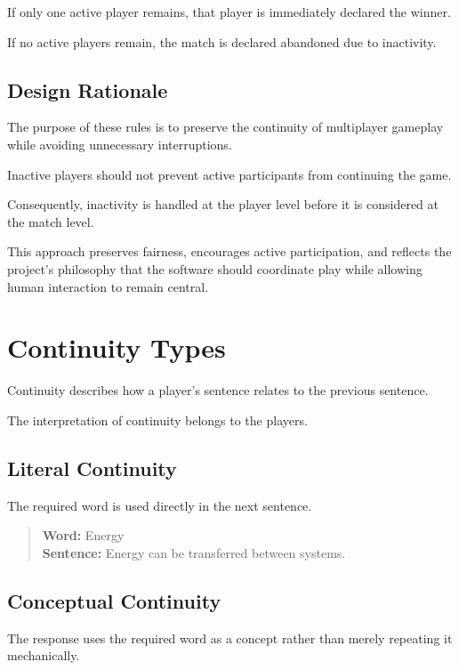 \documentclass[11pt,a4paper]{article}
\begin{document}
If only one active player remains, that player is immediately declared the winner.

If no active players remain, the match is declared abandoned due to inactivity.


\subsection{Design Rationale}

The purpose of these rules is to preserve the continuity of multiplayer gameplay while avoiding unnecessary interruptions.

Inactive players should not prevent active participants from continuing the game.

Consequently, inactivity is handled at the player level before it is considered at the match level.

This approach preserves fairness, encourages active participation, and reflects the project's philosophy that the software should coordinate play while allowing human interaction to remain central.

\section{Continuity Types}

Continuity describes how a player's sentence relates to the previous sentence.

The interpretation of continuity belongs to the players.

\subsection{Literal Continuity}

The required word is used directly in the next sentence.

\begin{quote}
\textbf{Word:} Energy\\
\textbf{Sentence:} Energy can be transferred between systems.
\end{quote}

\subsection{Conceptual Continuity}

The response uses the required word as a concept rather than merely repeating it mechanically.
\end{document}
